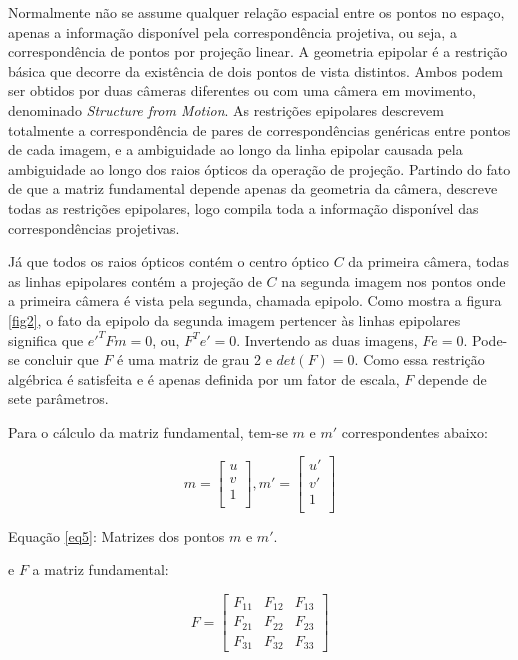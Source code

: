 Normalmente não se assume qualquer relação espacial entre os pontos no espaço, apenas a informação disponível pela correspondência projetiva, ou seja, a correspondência de pontos por projeção linear. A geometria epipolar é a restrição básica que decorre da existência de dois pontos de vista distintos. Ambos podem ser obtidos por duas câmeras diferentes ou com uma câmera em movimento, denominado \textit{Structure from Motion}. As restrições epipolares descrevem totalmente a correspondência de pares de correspondências genéricas entre pontos de cada imagem, e a ambiguidade ao longo da linha epipolar causada pela ambiguidade ao longo dos raios ópticos da operação de projeção. Partindo do fato de que a matriz fundamental depende apenas da geometria da câmera, descreve todas as restrições epipolares, logo compila toda a informação disponível das correspondências projetivas. 

Já que todos os raios ópticos contém o centro óptico $C$ da primeira câmera, todas as linhas epipolares contém a projeção de $C$ na segunda imagem nos pontos onde a primeira câmera é vista pela segunda, chamada epipolo. Como mostra a figura \ref{fig2}, o fato da epipolo da segunda imagem pertencer às linhas epipolares significa que $e'^{T}Fm = 0$, ou, $F^{T}e' = 0$. Invertendo as duas imagens, $Fe = 0$. Pode-se concluir que $F$ é uma matriz de grau 2 e $det(F) = 0$. Como essa restrição algébrica é satisfeita e é apenas definida por um fator de escala, $F$ depende de sete parâmetros.

Para o cálculo da matriz fundamental, tem-se $m$ e $m'$ correspondentes abaixo:

\begin{equation}\label{eq5}
m = \begin{bmatrix}u\\v\\1\\ \end{bmatrix}, 
m' = \begin{bmatrix}u'\\v'\\1\\ \end{bmatrix}
\end{equation}

Equação \eqref{eq5}: Matrizes dos pontos $m$ e $m'$.

e $F$ a matriz fundamental:

\begin{equation}\label{eq6}
F = 
\begin{bmatrix}
	F_{11} &  F_{12} &  F_{13}\\
	F_{21} &  F_{22} &  F_{23}\\
	F_{31} &  F_{32} &  F_{33}
\end{bmatrix}
\end{equation}

